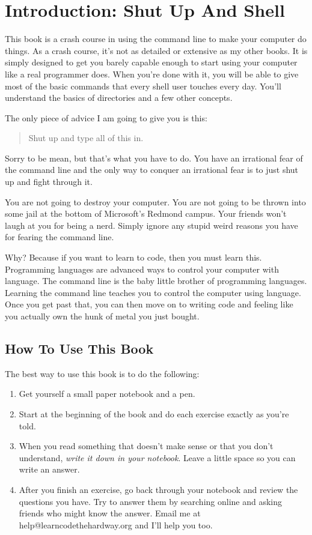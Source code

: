 \chapter*{Introduction: Shut Up And Shell}

This book is a crash course in using the command line to make your computer do
things.  As a crash course, it's not as detailed or extensive as my other
books.  It is simply designed to get you barely capable enough to start using
your computer like a real programmer does.  When you're done with it, you will
be able to give most of the basic commands that every shell user touches every
day.  You'll understand the basics of directories and a few other concepts.

The only piece of advice I am going to give you is this:

\begin{quote}
Shut up and type all of this in.
\end{quote}

Sorry to be mean, but that's what you have to do.  You have an irrational fear
of the command line and the only way to conquer an irrational fear is to just
shut up and fight through it.

You are not going to destroy your computer.  You are not going to be thrown
into some jail at the bottom of Microsoft's Redmond campus.  Your friends won't
laugh at you for being a nerd.  Simply ignore any stupid weird reasons you have
for fearing the command line.

Why?  Because if you want to learn to code, then you must learn this.
Programming languages are advanced ways to control your computer with language.
The command line is the baby little brother of programming languages.  Learning
the command line teaches you to control the computer using language.  Once you
get past that, you can then move on to writing code and feeling like you
actually own the hunk of metal you just bought.

\section{How To Use This Book}

The best way to use this book is to do the following:

\begin{enumerate}
\item Get yourself a small paper notebook and a pen.
\item Start at the beginning of the book and do each exercise exactly as you're told.
\item When you read something that doesn't make sense or that you don't understand, \emph{write it down in your notebook}.
    Leave a little space so you can write an answer.
\item After you finish an exercise, go back through your notebook and review the questions you have.  Try to answer them
    by searching online and asking friends who might know the answer.  Email me at help@learncodethehardway.org and I'll
    help you too.
\end{enumerate}

